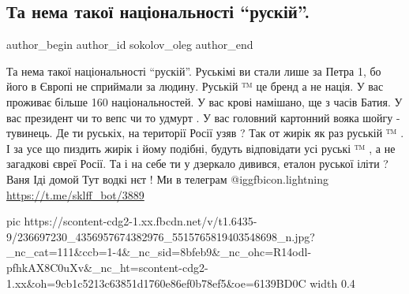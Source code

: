  
 
 
 
 
 
\subsection{Та нема такої національності \enquote{рускій}.}
\label{sec:12_08_2021.fb.sokolov_oleg.1.russkij_nacionalnost}
 
\ifcmt
 author_begin
   author_id sokolov_oleg
 author_end
\fi

\obeycr
Та нема такої національності \enquote{рускій}.
Руськімі ви стали лише за Петра 1, бо його в Європі не сприймали за людину.
Руській ™ це бренд а не нація.
У вас проживає більше 160 національностей.
У вас крові намішано, ще з часів Батия.
У вас президент чи то вепс чи то удмурт .
У вас головний картонний вояка шойгу - тувинець.
Де ти руськіх, на території Росії узяв ?
Так от жирік як раз руській ™ .
І за усе що пиздить жирік і йому подібні, будуть відповідати усі руські ™ , а не загадкові євреї Росії.
Та і на себе ти у дзеркало дивився, еталон руської іліти ?
Ваня
Іді домой
Тут водкі нєт !
Ми в телеграм @igg{fbicon.lightning}
\restorecr
\url{https://t.me/sklff_bot/3889}

\ifcmt
  pic https://scontent-cdg2-1.xx.fbcdn.net/v/t1.6435-9/236697230_4356957674382976_5515765819403548698_n.jpg?_nc_cat=111&ccb=1-4&_nc_sid=8bfeb9&_nc_ohc=R14odl-pfhkAX8C0uXv&_nc_ht=scontent-cdg2-1.xx&oh=9cb1c5213c63851d1760e86ef0b78ef5&oe=6139BD0C
  width 0.4
\fi
